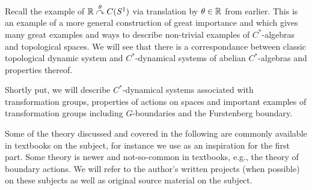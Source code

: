Recall the example of $\mathbb{R} \stackrel{\theta}{\curvearrowright} C(S^1)$ via translation by $\theta \in \mathbb{R}$ from earlier. This is an example of a more general construction of great importance and which gives many great examples and ways to describe non-trivial examples of $C^*$-algebras and topological spaces. We will see that there is a correspondance between classic topological dynamic system and $C^*$-dynamical systems of abelian $C^*$-algebras and properties thereof. 

Shortly put, we will describe $C^*$-dynamical systems associated with transformation groups, properties of actions on spaces and important examples of transformation groups including $G$-boundaries and the Furstenberg boundary. 

Some of the theory discussed and covered in the following are commonly available in textbooks on the subject, for instance we use \cite{williamscrossed} as an inspiration for the first part. Some theory is newer and not-so-common in textbooks, e.g., the theory of boundary actions. We will refer to the author's written projects (when possible) on these subjects as well as original source material on the subject.

